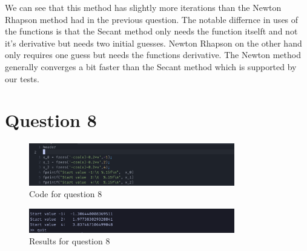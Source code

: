 \documentclass{article}
\begin{document}
We can see that this method has slightly more iterations than the Newton Rhapson method had in the previous question. The notable differnce in uses of the functions is that the Secant method only needs the function itselft and not it's derivative but needs two initial guesses.
Newton Rhapson on the other hand only requires one guess but needs the functions derivative. The Newton method generally converges a bit faster than the Secant method which is supported by our tests.


\newpage
\section{Question 8}

\begin{figure}[H]
	\centering
	\includegraphics[width=0.8\textwidth]{imgs/q8_code.png}
	\caption{Code for question 8}
	\label{fig:q8_code}
\end{figure}

\begin{figure}[H]
	\centering
	\includegraphics[width=0.8\textwidth]{imgs/q8_results.png}
	\caption{Results for question 8}
	\label{fig:q8_result}
\end{figure}
\end{document}
